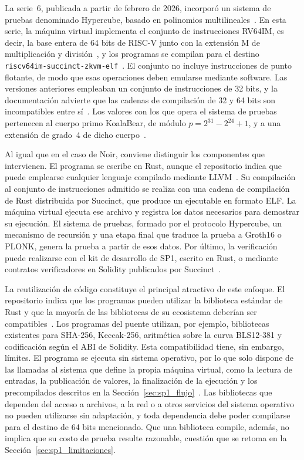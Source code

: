 La serie~6, publicada a partir de febrero de 2026, incorporó un sistema de pruebas denominado
Hypercube, basado en polinomios multilineales~\cite{sp1docsv6}. En esta serie, la máquina virtual
implementa el conjunto de instrucciones RV64IM, es decir, la base entera de 64 bits de RISC-V
junto con la extensión M de multiplicación y división~\cite{riscvmanual2024, sp1docsv6}, y los
programas se compilan para el destino \texttt{riscv64im-succinct-zkvm-elf}~\cite{sp1repo}. El
conjunto no incluye instrucciones de punto flotante, de modo que esas operaciones deben emularse
mediante software. Las versiones anteriores empleaban un conjunto de instrucciones de 32 bits, y
la documentación advierte que las cadenas de compilación de 32 y 64 bits son incompatibles entre
sí~\cite{sp1docsv6}. Los valores con los que opera el sistema de pruebas pertenecen al cuerpo
primo KoalaBear, de módulo $p = 2^{31} - 2^{24} + 1$, y a una extensión de grado~4 de dicho
cuerpo~\cite{sp1repo}.

Al igual que en el caso de Noir, conviene distinguir los componentes que intervienen. El programa
se escribe en Rust, aunque el repositorio indica que puede emplearse cualquier lenguaje compilado
mediante LLVM~\cite{sp1repo}. Su compilación al conjunto de instrucciones admitido se realiza con
una cadena de compilación de Rust distribuida por Succinct, que produce un ejecutable en formato
ELF. La máquina virtual ejecuta ese archivo y registra los datos necesarios para demostrar su
ejecución. El sistema de pruebas, formado por el protocolo Hypercube, un mecanismo de recursión y
una etapa final que traduce la prueba a Groth16 o PLONK, genera la prueba a partir de esos datos.
Por último, la verificación puede realizarse con el kit de desarrollo de SP1, escrito en Rust, o
mediante contratos verificadores en Solidity publicados por Succinct~\cite{sp1repo,
sp1contracts}.

La reutilización de código constituye el principal atractivo de este enfoque. El repositorio
indica que los programas pueden utilizar la biblioteca estándar de Rust y que la mayoría de las
bibliotecas de su ecosistema deberían ser compatibles~\cite{sp1repo}. Los programas del puente
utilizan, por ejemplo, bibliotecas existentes para SHA-256, Keccak-256, aritmética sobre la curva
BLS12-381 y codificación según el ABI de Solidity. Esta compatibilidad tiene, sin embargo,
límites. El programa se ejecuta sin sistema operativo, por lo que solo dispone de las llamadas al
sistema que define la propia máquina virtual, como la lectura de entradas, la publicación de
valores, la finalización de la ejecución y los precompilados descritos en la
Sección~\ref{sec:sp1_flujo}~\cite{sp1repo}. Las bibliotecas que dependen del acceso a archivos, a
la red o a otros servicios del sistema operativo no pueden utilizarse sin adaptación, y toda
dependencia debe poder compilarse para el destino de 64 bits mencionado. Que una biblioteca
compile, además, no implica que su costo de prueba resulte razonable, cuestión que se retoma en la
Sección~\ref{sec:sp1_limitaciones}.


